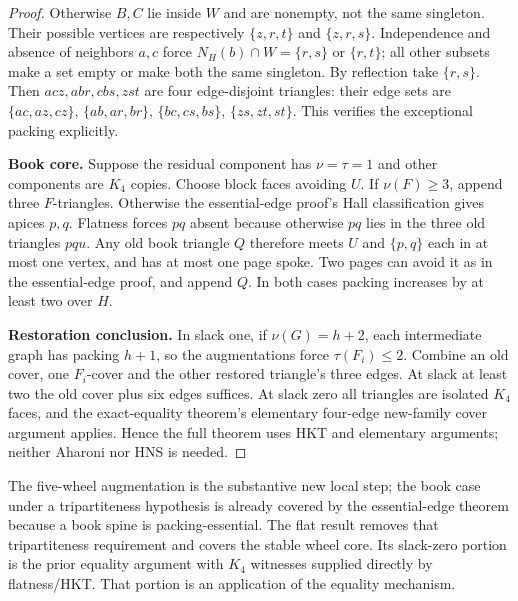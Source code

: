 \documentclass[11pt]{article}
\theoremstyle{definition}\newtheorem{definition}[theorem]{Definition}
\theoremstyle{remark}\newtheorem{remark}[theorem]{Remark}
\begin{document}
\begin{proof}
Otherwise \(B,C\) lie inside \(W\) and are nonempty, not the same singleton. Their possible vertices are respectively \(\{z,r,t\}\) and \(\{z,r,s\}\). Independence and absence of neighbors \(a,c\) force \(N_H(b) \cap W=\{r,s\}\) or \(\{r,t\}\); all other subsets make a set empty or make both the same singleton. By reflection take \(\{r,s\}\). Then \(acz,abr,cbs,zst\) are four edge-disjoint triangles: their edge sets are \(\{ac,az,cz\}\), \(\{ab,ar,br\}\), \(\{bc,cs,bs\}\), \(\{zs,zt,st\}\). This verifies the exceptional packing explicitly.

\textbf{Book core.} Suppose the residual component has \(\nu=\tau=1\) and other components are \(K_4\) copies. Choose block faces avoiding \(U\). If \(\nu(F)\ge 3\), append three \(F\)-triangles. Otherwise the essential-edge proof's Hall classification gives apices \(p,q\). Flatness forces \(pq\) absent because otherwise \(pq\) lies in the three old triangles \(pqu\). Any old book triangle \(Q\) therefore meets \(U\) and \(\{p,q\}\) each in at most one vertex, and has at most one page spoke. Two pages can avoid it as in the essential-edge proof, and append \(Q\). In both cases packing increases by at least two over \(H\).

\textbf{Restoration conclusion.} In slack one, if \(\nu(G)=h+2\), each intermediate graph has packing \(h+1\), so the augmentations force \(\tau(F_i)\le 2\). Combine an old cover, one \(F_i\)-cover and the other restored triangle's three edges. At slack at least two the old cover plus six edges suffices. At slack zero all triangles are isolated \(K_4\) faces, and the exact-equality theorem's elementary four-edge new-family cover argument applies. Hence the full theorem uses HKT and elementary arguments; neither Aharoni nor HNS is needed.
\end{proof}
The five-wheel augmentation is the substantive new local step; the book case under a tripartiteness hypothesis is already covered by the essential-edge theorem because a book spine is packing-essential. The flat result removes that tripartiteness requirement and covers the stable wheel core. Its slack-zero portion is the prior equality argument with \(K_4\) witnesses supplied directly by flatness/HKT. That portion is an application of the equality mechanism.
\end{document}
